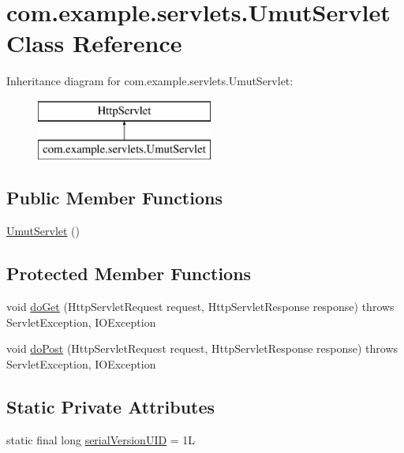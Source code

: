 \hypertarget{classcom_1_1example_1_1servlets_1_1_umut_servlet}{}\section{com.\+example.\+servlets.\+Umut\+Servlet Class Reference}
\label{classcom_1_1example_1_1servlets_1_1_umut_servlet}
Inheritance diagram for com.\+example.\+servlets.\+Umut\+Servlet\+:\begin{figure}[H]
\begin{center}
\leavevmode
\includegraphics[height=2.000000cm]{classcom_1_1example_1_1servlets_1_1_umut_servlet}
\end{center}
\end{figure}
\subsection*{Public Member Functions}
\begin{DoxyCompactItemize}
\item 
\hyperlink{classcom_1_1example_1_1servlets_1_1_umut_servlet_a187d7bf04e87a540c3d2b52c44c14cf3}{Umut\+Servlet} ()
\end{DoxyCompactItemize}
\subsection*{Protected Member Functions}
\begin{DoxyCompactItemize}
\item 
void \hyperlink{classcom_1_1example_1_1servlets_1_1_umut_servlet_a4dba74dc02d5fe491b718022fe0e3298}{do\+Get} (Http\+Servlet\+Request request, Http\+Servlet\+Response response)  throws Servlet\+Exception, I\+O\+Exception 
\item 
void \hyperlink{classcom_1_1example_1_1servlets_1_1_umut_servlet_a10d9e55aee3af4c8023325a534f6b484}{do\+Post} (Http\+Servlet\+Request request, Http\+Servlet\+Response response)  throws Servlet\+Exception, I\+O\+Exception 
\end{DoxyCompactItemize}
\subsection*{Static Private Attributes}
\begin{DoxyCompactItemize}
\item 
static final long \hyperlink{classcom_1_1example_1_1servlets_1_1_umut_servlet_a2ac8210ed285393de2a441e311db1ea5}{serial\+Version\+U\+I\+D} = 1\+L
\end{DoxyCompactItemize}


